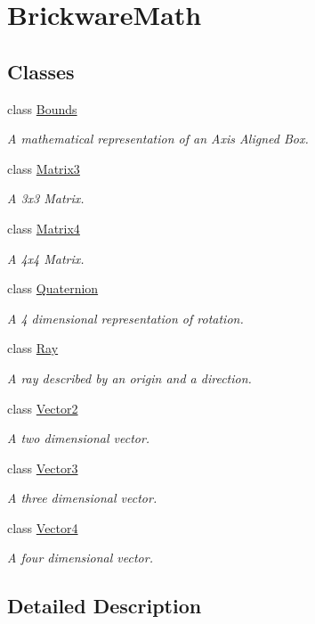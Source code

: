 \hypertarget{group__BrickwareMath}{}\section{Brickware\+Math}
\label{group__BrickwareMath}
\subsection*{Classes}
\begin{DoxyCompactItemize}
\item 
class \hyperlink{classBounds}{Bounds}
\begin{DoxyCompactList}\small\item\em A mathematical representation of an Axis Aligned Box. \end{DoxyCompactList}\item 
class \hyperlink{classMatrix3}{Matrix3}
\begin{DoxyCompactList}\small\item\em A 3x3 Matrix. \end{DoxyCompactList}\item 
class \hyperlink{classMatrix4}{Matrix4}
\begin{DoxyCompactList}\small\item\em A 4x4 Matrix. \end{DoxyCompactList}\item 
class \hyperlink{classQuaternion}{Quaternion}
\begin{DoxyCompactList}\small\item\em A 4 dimensional representation of rotation. \end{DoxyCompactList}\item 
class \hyperlink{classRay}{Ray}
\begin{DoxyCompactList}\small\item\em A ray described by an origin and a direction. \end{DoxyCompactList}\item 
class \hyperlink{classVector2}{Vector2}
\begin{DoxyCompactList}\small\item\em A two dimensional vector. \end{DoxyCompactList}\item 
class \hyperlink{classVector3}{Vector3}
\begin{DoxyCompactList}\small\item\em A three dimensional vector. \end{DoxyCompactList}\item 
class \hyperlink{classVector4}{Vector4}
\begin{DoxyCompactList}\small\item\em A four dimensional vector. \end{DoxyCompactList}\end{DoxyCompactItemize}


\subsection{Detailed Description}
